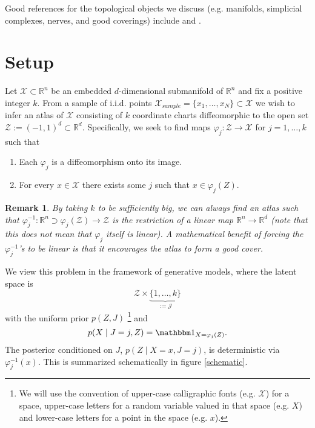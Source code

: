 \documentclass[reqno,11pt]{article}
\renewcommand{\phi}{\varphi}
\newcommand{\X}{\mathcal{X}}
\newcommand{\Z}{\mathcal{Z}}
\newcommand{\R}{\mathbb{R}}
\newtheorem{remark}{Remark}
\begin{document}
Good references for the topological objects we discuss (e.g. manifolds, simplicial complexes, nerves, and good coverings) include \cite{BottTu} and \cite{Hatcher}.

\section{Setup}
Let $\X \subset \R^n$ be an embedded $d$-dimensional submanifold of $\R^n$ and fix a positive integer $k$. From a sample of i.i.d. points $\X_{sample} = \{x_1,\ldots,x_N\} \subset \X$ we wish to infer an atlas of $\X$ consisting of $k$ coordinate charts diffeomorphic to the open set $\Z := (-1,1)^d \subset \R^d$. Specifically, we seek to find maps $\phi_j : \Z \to \X$ for $j=1,\ldots,k$ such that
\begin{enumerate}
\item Each $\phi_j$ is a diffeomorphism onto its image.
\item For every $x \in \X$ there exists some $j$ such that $x \in \phi_j(Z)$.
\end{enumerate}
\begin{remark}\label{linearity-remark}
By taking $k$ to be sufficiently big, we can always find an atlas such that $\phi_j^{-1} : \R^n \supset \phi_j(\Z) \to \Z$ is the restriction of a linear map $\R^n\to \R^d$ (note that this does not mean that $\phi_j$ itself is linear). A mathematical benefit of forcing the $\phi_j^{-1}$'s to be linear is that it encourages the atlas to form a good cover.
\end{remark}


We view this problem in the framework of generative models, where the latent space is 
\[
\Z \times\underbrace{\{1, \ldots, k\}}_{:= \mathcal J}
\]
with the uniform prior $p(Z, J)$ \footnote{We will use the convention of upper-case calligraphic fonts (e.g. $\X$) for a space, upper-case letters for a random variable valued in that space (e.g. $X$) and lower-case letters for a point in the space (e.g. $x$).} and
\[
p(X \mid J=j, Z) = \mathbbm 1_{X = \phi_j(Z)}.
\]
The posterior conditioned on $J$, $p(Z \mid X=x, J=j)$, is deterministic via $\phi_j^{-1}(x)$.  This is summarized schematically in figure \ref{schematic}.
\end{document}

